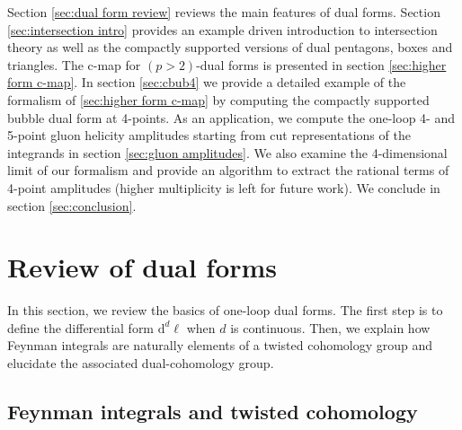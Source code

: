 \documentclass[11pt]{article}
\renewcommand{\d}{\text{d}}
\begin{document}
Section \ref{sec:dual form review} reviews the main features of dual forms. 
Section \ref{sec:intersection intro} provides an example driven introduction to intersection theory as well as the compactly supported versions of dual pentagons, boxes and triangles. 
The c-map for $(p>2)$-dual forms is presented in section \ref{sec:higher form c-map}.   
In section \ref{sec:cbub4} we provide a detailed example of the formalism of \ref{sec:higher form c-map} by computing the compactly supported bubble dual form at 4-points. 
As an application, we compute the  one-loop 4- and 5-point gluon helicity amplitudes starting from cut representations of the integrands in section \ref{sec:gluon amplitudes}. 
We also examine the 4-dimensional limit of our formalism and provide an algorithm to extract the rational terms of 4-point amplitudes (higher multiplicity is left for future work). 
We conclude in section \ref{sec:conclusion}.


\section{Review of dual forms \label{sec:dual form review}}

In this section, we review the basics of one-loop dual forms. The first step is to define the differential form $\d^d\ell$ when $d$ is continuous. Then, we explain how Feynman integrals are naturally elements of a twisted cohomology group and elucidate the associated dual-cohomology group. 

\subsection{Feynman integrals and twisted cohomology}
\end{document}
